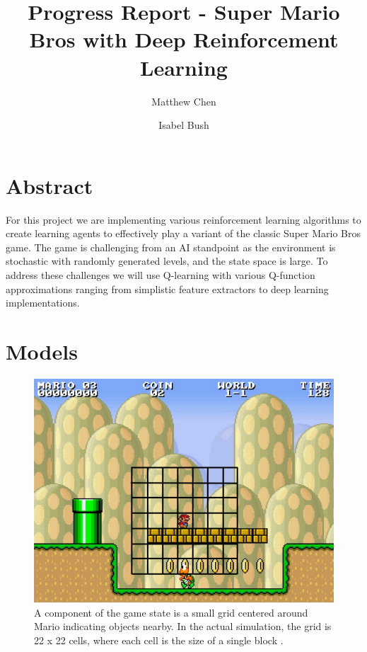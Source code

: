 \documentclass[12pt]{article}
\begin{document}
\nocite{*}

\title{Progress Report - Super Mario Bros with Deep Reinforcement Learning}

\author{
  Matthew Chen
  \and
  Isabel Bush
}
\date{}
\maketitle


\section{Abstract}

For this project we are implementing various reinforcement learning algorithms to create learning agents to effectively play a variant of the classic Super Mario Bros game. The game is challenging from an AI standpoint as the environment is stochastic with randomly generated levels, and the state space is large. To address these challenges we will use Q-learning with various Q-function approximations ranging from simplistic feature extractors to deep learning implementations.


\section{Models}

\begin{figure}
\centering
\includegraphics[scale=0.5]{imgs/mario_grid}
\caption{A component of the game state is a small grid centered around Mario indicating objects nearby. In the actual simulation, the grid is 22 x 22 cells, where each cell is the size of a single block \cite{karakovskiy}.}
\label{mario_grid}
\end{figure}
\end{document}
